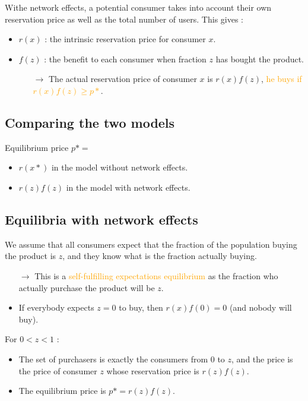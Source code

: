 Withe network effects, a potential consumer takes into account their own reservation price as well as the total number of users. This gives :
\begin{itemize}
\item $r(x)$ : the intrinsic reservation price for consumer $x$.
\item $f(z)$ : the benefit to each consumer when fraction $z$ has bought the product.
	\begin{itemize}
	\item[$\rightarrow$] The actual reservation price of consumer $x$ is $r(x)f(z)$, \textcolor{orange}{he buys if $r(x)f(z) \geq p*$}.
	\end{itemize}
\end{itemize}

\newpage
\subsection{Comparing the two models}

Equilibrium price $p* =$
\begin{itemize}
\item $r(x*)$ in the model without network effects.
\item $r(z)f(z)$ in the model with network effects.
\end{itemize}

\subsection{Equilibria with network effects}

We assume that all consumers expect that the fraction of the population buying the product is $z$, and they know what is the fraction actually buying.
\begin{itemize}
\item[$\rightarrow$] This is a \textcolor{orange}{self-fulfilling expectations equilibrium} as the fraction who actually purchase the product will be $z$.
\item If everybody expects $z = 0$ to buy, then $r(x)f(0) = 0$ (and nobody will buy).
\end{itemize}

For $0<z<1$ :
\begin{itemize}
\item The set of purchasers is exactly the consumers from $0$ to $z$, and the price is the price of consumer $z$ whose reservation price is $r(z)f(z)$.
\item The equilibrium price is $p* = r(z)f(z)$.
\end{itemize}

